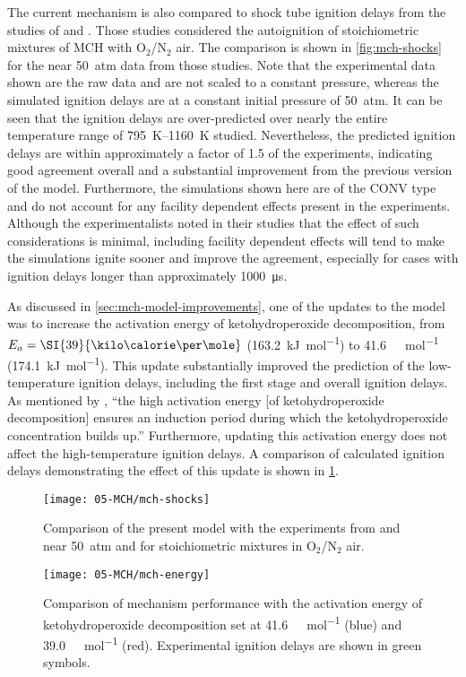 \documentclass[../main.tex]{subfiles}
\begin{document}
The current mechanism is also compared to shock tube ignition delays from the
studies of \textcite{Vasu2009} and \textcite{Vanderover2009}. Those studies
considered the autoignition of stoichiometric mixtures of MCH with O$_2$/N$_2$
air. The comparison is shown in \cref{fig:mch-shocks} for the near \SI{50}{atm}
data from those studies. Note that the experimental data shown are the raw
data and are not scaled to a constant pressure, whereas the simulated
ignition delays are at a constant initial pressure of \SI{50}{atm}. It can be seen
that the ignition delays are over-predicted over nearly the entire temperature
range of \SIrange{795}{1160}{\kelvin} studied. Nevertheless, the predicted ignition delays are
within approximately a factor of 1.5 of the experiments, indicating good
agreement overall and a substantial improvement from the previous version of
the model. Furthermore, the simulations shown here are of the CONV type and
do not account for any facility dependent effects present in the experiments.
Although the experimentalists noted in their studies \cite{Vasu2009,Vanderover2009}
that the effect of such considerations is minimal, including facility
dependent effects will tend to make the simulations ignite sooner and improve
the agreement, especially for cases with ignition delays longer than
approximately \SI{1000}{\micro\second}.

As discussed in \cref{sec:mch-model-improvements}, one of the updates to the model
was to increase the activation energy of ketohydroperoxide decomposition, from
$E_a=\SI{39}{\kilo\calorie\per\mole}$ (\SI{163.2}{\kilo\joule\per\mole}) to
\SI{41.6}{\kilo\calorie\per\mole} (\SI{174.1}{\kilo\joule\per\mole}). This
update substantially improved the prediction of the low-temperature ignition
delays, including the first stage and overall ignition delays. As mentioned by
\textcite{Curran2002}, ``the high activation energy [of ketohydroperoxide
decomposition] ensures an induction period during which the ketohydroperoxide
concentration builds up.'' Furthermore, updating this activation energy does not
affect the high-temperature ignition delays. A comparison of calculated
ignition delays demonstrating the effect of this update is shown in
\cref{fig:mch-energy}.

\begin{figure}
    \begin{floatrow}
        \ffigbox
            {\texttt{[image: 05-MCH/mch-shocks]}}
            {\caption{Comparison of the present model with the experiments from
                \textcite{Vasu2009} and \textcite{Vanderover2009} near \SI{50}{atm}
                and for stoichiometric mixtures in O$_2$/N$_2$ air.}
            \label{fig:mch-shocks}}
        \ffigbox
            {\texttt{[image: 05-MCH/mch-energy]}}
            {\caption{Comparison of mechanism performance with the activation energy
                of ketohydroperoxide decomposition set at \SI{41.6}{\kilo\calorie\per\mole} (blue) and
                \SI{39.0}{\kilo\calorie\per\mole} (red). Experimental ignition delays are shown in
                green symbols.}
            \label{fig:mch-energy}}
    \end{floatrow}
\end{figure}
\end{document}
